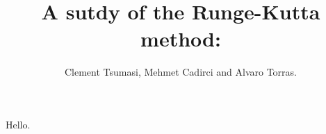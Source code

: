 \documentclass{article}
\title{A sutdy of the Runge-Kutta method:}
\author{Clement Tsumasi, Mehmet Cadirci and Alvaro Torras.}
\begin{document}
    \maketitle
    Hello.
\end{document}
